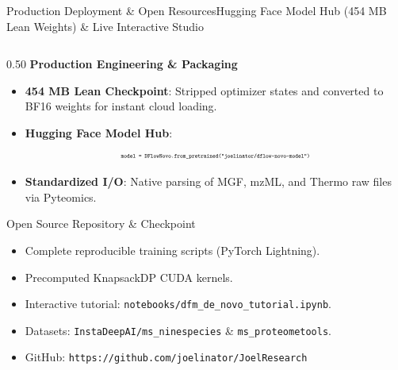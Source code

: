 \documentclass[aspectratio=169, 10pt]{beamer}
\begin{document}
\begin{frame}{Production Deployment \& Open Resources}{Hugging Face Model Hub (454 MB Lean Weights) \& Live Interactive Studio}
\begin{columns}[T]
\begin{column}{0.50\textwidth}
  \textbf{\footnotesize Production Engineering \& Packaging}
  \begin{itemize}\setlength{\itemsep}{2pt}\scriptsize
    \item \textbf{454 MB Lean Checkpoint}: Stripped optimizer states and converted to BF16 weights for instant cloud loading.
    \item \textbf{Hugging Face Model Hub}:
    \begin{equation*}
      \texttt{\tiny model = DFlowNovo.from\_pretrained("joelinator/dflow-novo-model")}
    \end{equation*}
    \item \textbf{Standardized I/O}: Native parsing of MGF, mzML, and Thermo raw files via Pyteomics.
  \end{itemize}
  \vspace{0.05cm}
  \begin{exampleblock}{\scriptsize Open Source Repository \& Checkpoint}
    \begin{itemize}\setlength{\itemsep}{1pt}\tiny
      \item Complete reproducible training scripts (PyTorch Lightning).
      \item Precomputed KnapsackDP CUDA kernels.
      \item Interactive tutorial: \texttt{notebooks/dfm\_de\_novo\_tutorial.ipynb}.
      \item Datasets: \texttt{InstaDeepAI/ms\_ninespecies} \& \texttt{ms\_proteometools}.
      \item GitHub: \texttt{https://github.com/joelinator/JoelResearch}
    \end{itemize}
  \end{exampleblock}
\end{column}


\end{columns}
\end{frame}
\end{document}
